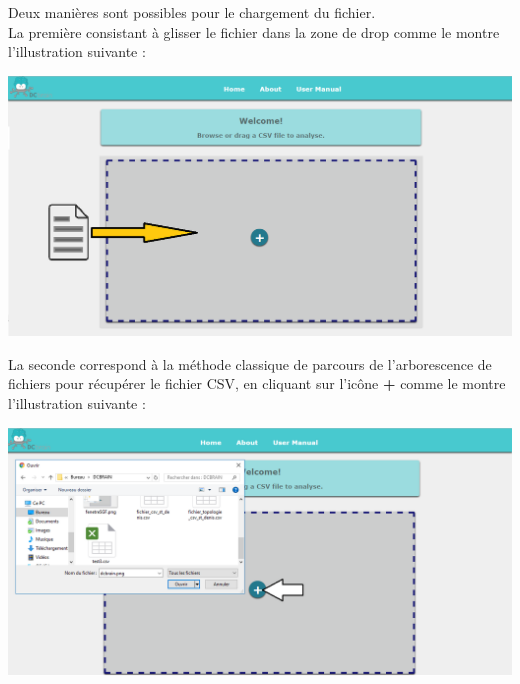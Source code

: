 		Deux manières sont possibles pour le chargement du fichier.\\
		La première consistant à glisser le fichier dans la zone de drop comme le montre l'illustration suivante :
		
	\begin{center}\includegraphics[scale=0.45]{fenetreDragDrop.png}\end{center}
		  
		 La seconde correspond à la méthode classique de parcours de l'arborescence de fichiers pour récupérer le fichier CSV, en cliquant sur l'icône \textbf{+} comme le montre l'illustration suivante :
		 
	\begin{center}\includegraphics[scale=0.45]{fenetreSGF.png}\end{center}
	
